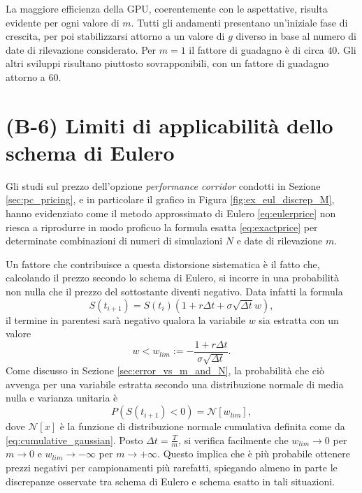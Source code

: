 La maggiore efficienza della GPU, coerentemente con le aspettative, risulta evidente per ogni valore di $m$. Tutti gli andamenti presentano un'iniziale fase di crescita, per poi stabilizzarsi attorno a un valore di $g$ diverso in base al numero di date di rilevazione considerato. Per $m=1$ il fattore di guadagno è di circa $40$. Gli altri sviluppi risultano piuttosto sovrapponibili, con un fattore di guadagno attorno a $60$.

\section{(B-6) Limiti di applicabilità dello schema di Eulero} \label{sec:limits}

Gli studi sul prezzo dell'opzione \textit{performance corridor} condotti in Sezione \ref{sec:pc_pricing}, e in particolare il grafico in Figura \ref{fig:ex_eul_discrep_M}, hanno evidenziato come il metodo approssimato di Eulero \eqref{eq:eulerprice} non riesca a riprodurre in modo proficuo la formula esatta \eqref{eq:exactprice} per determinate combinazioni di numeri di simulazioni $N$ e date di rilevazione $m$.

Un fattore che contribuisce a questa distorsione sistematica è il fatto che, calcolando il prezzo secondo lo schema di Eulero, si incorre in una probabilità non nulla che il prezzo del sottostante diventi negativo. Data infatti la formula
\begin{equation}
    S(t_{i+1}) = S(t_i) \left(1 + r \Delta t + \sigma \sqrt{\Delta t} w\right),
    \label{eulerprice_repeat}
\end{equation}
il termine in parentesi sarà negativo qualora la variabile $w$ sia estratta con un valore
\begin{equation}
    w < w_{lim} := - \frac{1+r \Delta t}{\sigma \sqrt{\Delta t}}.
    \label{eq:wcondition_withsigma}
\end{equation}
Come discusso in Sezione \ref{sec:error_vs_m_and_N}, la probabilità che ciò avvenga per una variabile estratta secondo una distribuzione normale di media nulla e varianza unitaria è
\begin{equation}
    P\left(S(t_{i+1})<0\right) = \mathcal{N}\left[w_{lim} \right],
    \label{eq:probability_negativeprice}
\end{equation}
dove $\mathcal{N}[x]$ è la funzione di distribuzione normale cumulativa definita come da \eqref{eq:cumulative_gaussian}. Posto $\Delta t = \frac{T}{m}$, si verifica facilmente che $w_{lim} \rightarrow 0$ per $m \rightarrow 0$ e $w_{lim} \rightarrow -\infty$ per $m \rightarrow +\infty$. Questo implica che è più probabile ottenere prezzi negativi per campionamenti più rarefatti, spiegando almeno in parte le discrepanze osservate tra schema di Eulero e schema esatto in tali situazioni.


